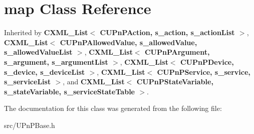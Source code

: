 \section{map Class Reference}
\label{classstd_1_1map}


Inherited by {\bf CXML\_\-List$<$ CUPnPAction, s\_\-action, s\_\-actionList $>$}, {\bf CXML\_\-List$<$ CUPnPAllowedValue, s\_\-allowedValue, s\_\-allowedValueList $>$}, {\bf CXML\_\-List$<$ CUPnPArgument, s\_\-argument, s\_\-argumentList $>$}, {\bf CXML\_\-List$<$ CUPnPDevice, s\_\-device, s\_\-deviceList $>$}, {\bf CXML\_\-List$<$ CUPnPService, s\_\-service, s\_\-serviceList $>$}, and {\bf CXML\_\-List$<$ CUPnPStateVariable, s\_\-stateVariable, s\_\-serviceStateTable $>$}.

The documentation for this class was generated from the following file:\begin{DoxyCompactItemize}
\item 
src/UPnPBase.h\end{DoxyCompactItemize}
